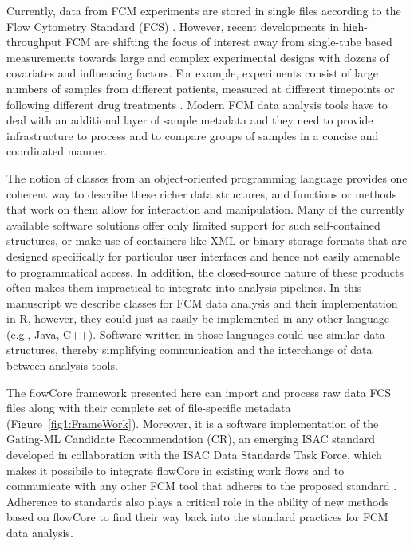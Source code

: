 \documentclass[12pt]{article}
\newcommand{\Rpackage}[1]{{\textsf{#1}}}
\begin{document}
Currently, data from FCM experiments are stored in single files
according to the Flow Cytometry Standard (FCS) \citep{seamer1997pnd}.
However, recent developments in high-throughput FCM are shifting the
focus of interest away from single-tube based measurements towards
large and complex experimental designs with dozens of covariates and
influencing factors. For example, experiments consist of large numbers
of samples from different patients, measured at different timepoints
\citep{brinkman2007hcf} or following different drug treatments
\citep{gasparetto2004ice}. Modern FCM data analysis tools have to deal
with an additional layer of sample metadata and they need to provide
infrastructure to process and to compare groups of samples in a
concise and coordinated manner.

The notion of classes from an object-oriented programming language
provides one coherent way to describe these richer data structures,
and functions or methods that work on them allow for interaction and
manipulation. Many of the currently available software solutions offer
only limited support for such self-contained structures, or make use
of containers like XML or binary storage formats that are designed
specifically for particular user interfaces and hence not easily
amenable to programmatical access. In addition, the closed-source
nature of these products often makes them impractical to integrate
into analysis pipelines. In this manuscript we describe classes for
FCM data analysis and their implementation in R, however, they could
just as easily be implemented in any other language (e.g., Java,
C++). Software written in those languages could use similar data
structures, thereby simplifying communication and the interchange of
data between analysis tools.

The \Rpackage{flowCore} framework presented here can import and
process raw data FCS files along with their complete set of
file-specific metadata (Figure~\ref{fig1:FrameWork}).  Moreover, it is
a software implementation of the Gating-ML Candidate Recommendation
(CR), an emerging ISAC standard developed in collaboration with the
ISAC Data Standards Task Force, which makes it possibile to integrate
\Rpackage{flowCore} in existing work flows and to communicate with any
other FCM tool that adheres to the proposed standard
\citep{SpidlenInPressCytometryA}. Adherence to standards also plays a
critical role in the ability of new methods based on
\Rpackage{flowCore} to find their way back into the standard practices
for FCM data analysis.
\end{document}

